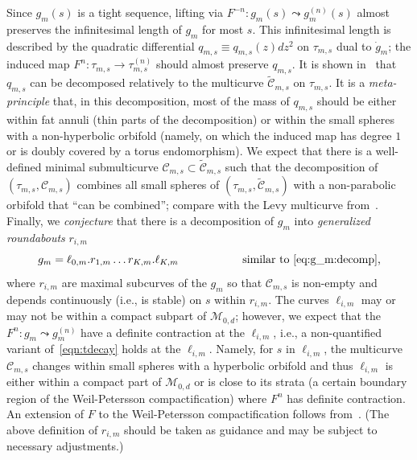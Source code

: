 \documentclass{amsart}
\theoremstyle{definition}
\theoremstyle{remark}
\begin{document}
Since $g_m(s)$ is a tight sequence, lifting  via $F^{-n}\colon g_m(s)\leadsto g_m^{(n)}(s)$ almost preserves the infinitesimal length of $g_m$ for most $s$. This infinitesimal length is described by the quadratic differential $q_{m,s}\equiv q_{m,s} (z)dz^2$ on $\tau_{m,s}$ dual to $\dot g_{m}$; the induced map $F^n\colon \tau_{m,s}\to\tau^{(n)}_{m,s}$ should almost preserve $q_{m,s}$. It is shown in~\cite{HSS} that $q_{m,s}$ can be decomposed relatively to the multicurve $\widetilde{\mathscr C}_{m,s}$ on $\tau_{m,s}$. It is a \emph{meta-principle} that, in this decomposition, most of the mass of $q_{m,s}$ should be either within fat annuli (thin parts of the decomposition) or within the small spheres with a non-hyperbolic orbifold (namely, on which the induced map has degree $1$ or is doubly covered by a torus endomorphism). We expect that there is a well-defined minimal submulticurve $\mathscr C_{m,s}\subset \widetilde{\mathscr C}_{m,s}$ such that the decomposition of  $(\tau_{m,s}, {\mathscr C}_{m,s})$ combines all small spheres of  $(\tau_{m,s}, \widetilde{\mathscr C}_{m,s})$ with a non-parabolic orbifold that ``can be combined''; compare with the Levy multicurve from~\cite{BD4}. Finally, we \emph{conjecture} that there is a decomposition of $g_m$ into \emph{generalized roundabouts} $r_{i,m}$
\begin{equation}
\label{eq:strategy:g}
g_m=\ell_{0,m}. r_{1,m}\dots r_{K,m}.\ell_{K,m}\hspace{2cm}\text{similar to~\eqref{eq:g_m:decomp},}
\end{equation}
where $r_{i,m}$ are maximal subcurves of the $g_{m}$ so that $\mathscr C_{m,s}$ is non-empty and depends continuously (i.e., is stable) on $s$ within $r_{i,m}$. The curves $\ell_{i,m}$ may or may not be within a compact subpart of $\mathscr M_{0,d}$; however, we expect that the $F^n\colon g_m\leadsto g_m^{(n)}$ have a definite contraction at the $\ell_{i,m}$, i.e., a non-quantified variant of~\eqref{eqn:tdecay} holds at the $\ell_{i,m}$. Namely, for $s$ in $\ell_{i,m}$, the multicurve ${\mathscr C}_{m,s}$ changes within small spheres with a hyperbolic orbifold and thus $\ell_{i,m}$ is either within a compact part of  $\mathscr M_{0,d}$ or is close to its strata (a certain boundary region of the Weil-Petersson compactification) where $F^n$ has definite contraction. An extension of $F$ to the Weil-Petersson compactification follows from~\cite{selinger:pullback}. (The above definition of $r_{i,m}$ should be taken as guidance and may be subject to necessary adjustments.)
\end{document}

